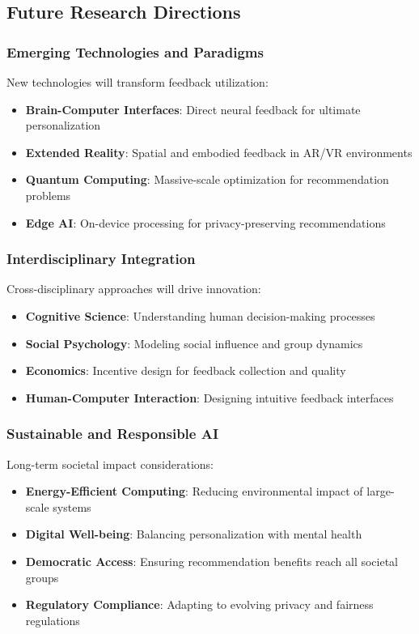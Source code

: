 \documentclass[acmsmall,review,anonymous]{acmart}
\begin{document}
\subsection{Future Research Directions}

\subsubsection{Emerging Technologies and Paradigms}

New technologies will transform feedback utilization:

\begin{itemize}
    \item \textbf{Brain-Computer Interfaces}: Direct neural feedback for ultimate personalization
    \item \textbf{Extended Reality}: Spatial and embodied feedback in AR/VR environments
    \item \textbf{Quantum Computing}: Massive-scale optimization for recommendation problems
    \item \textbf{Edge AI}: On-device processing for privacy-preserving recommendations
\end{itemize}

\subsubsection{Interdisciplinary Integration}

Cross-disciplinary approaches will drive innovation:

\begin{itemize}
    \item \textbf{Cognitive Science}: Understanding human decision-making processes
    \item \textbf{Social Psychology}: Modeling social influence and group dynamics
    \item \textbf{Economics}: Incentive design for feedback collection and quality
    \item \textbf{Human-Computer Interaction}: Designing intuitive feedback interfaces
\end{itemize}

\subsubsection{Sustainable and Responsible AI}

Long-term societal impact considerations:

\begin{itemize}
    \item \textbf{Energy-Efficient Computing}: Reducing environmental impact of large-scale systems
    \item \textbf{Digital Well-being}: Balancing personalization with mental health
    \item \textbf{Democratic Access}: Ensuring recommendation benefits reach all societal groups
    \item \textbf{Regulatory Compliance}: Adapting to evolving privacy and fairness regulations
\end{itemize}
\end{document}
